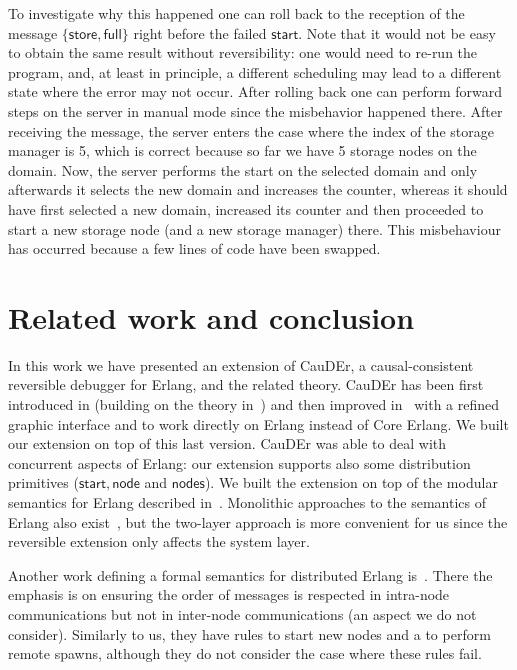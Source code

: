 \documentclass[runningheads]{llncs}
\newcommand{\ms}[1]{\mathsf{#1}}
\begin{document}
To
investigate why this happened one can roll back to the reception of the message
$\ms{\{store,full\}}$ right before the failed $\ms{start}$.
Note that it would not be easy to obtain the same result without reversibility:
one would need to re-run the program, and, at least in principle, a different scheduling may lead to a different state where the error may not occur.
After rolling back one can perform
forward steps on the server in manual mode since the misbehavior happened there. After receiving the message, the server enters the case where the index of
the storage manager is 5, which is correct because so far we have 5 storage nodes on
the domain. Now, the server performs the start on the selected domain and only afterwards it selects the new
domain and increases the counter, whereas it should have first selected a new
domain, increased its counter and then proceeded to start a new storage node
(and a new storage manager) there. This misbehaviour has occurred because a few
lines of code have been swapped.


\section{Related work and conclusion}\label{sec:related}

In this work we have presented an extension of CauDEr, a
causal-consistent reversible debugger for Erlang, and the related
theory. CauDEr has been first introduced in \cite{LNPV18}
(building on the theory in~\cite{LaneseNPV18}) and then improved
in~\cite{Gonzalez-AbrilV21} with a refined graphic interface and to
work directly on Erlang instead of Core Erlang. We built our extension
on top of this last version. CauDEr was able to deal with
concurrent aspects of Erlang: our extension supports also some
distribution primitives ($\ms{start, node}$ and $\ms{nodes}$). We built
the extension on top of the modular semantics for Erlang described
in~\cite{LaneseNPV18,Gonzalez-AbrilV21}. Monolithic approaches to the
semantics of Erlang also exist~\cite{unif-sem-erl}, but the two-layer
approach is more convenient for us since the reversible extension only
affects the system layer.

Another work defining a formal semantics for distributed Erlang
is~\cite{paper:distributed-erlang-sem}. There the emphasis is on ensuring the
order of messages is respected in intra-node communications but not in inter-node communications (an aspect we do
not consider). Similarly to us, they have rules to start new nodes and a to perform
remote spawns, although they do not consider the case where these rules fail.
\end{document}
